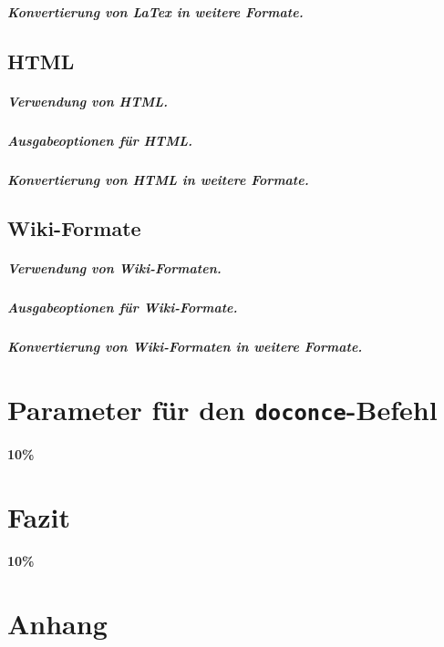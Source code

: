 \documentclass[%
oneside,                 %
final,                   %
chapterprefix=true,      %
open=right,              %
10pt]{book}
\begin{document}
\paragraph{ Konvertierung von LaTex in weitere Formate.}
\section{HTML}
\paragraph{ Verwendung von HTML.}
\paragraph{ Ausgabeoptionen für HTML.}
\paragraph{ Konvertierung von HTML in weitere Formate.}
\section{Wiki-Formate}
\paragraph{ Verwendung von Wiki-Formaten.}
\paragraph{ Ausgabeoptionen für Wiki-Formate.}
\paragraph{ Konvertierung von Wiki-Formaten in weitere Formate.}
\chapter{Parameter für den \texttt{doconce}-Befehl}
\textbf{10\%}
\chapter{Fazit}
\textbf{10\%}
\chapter{Anhang}
\end{document}
